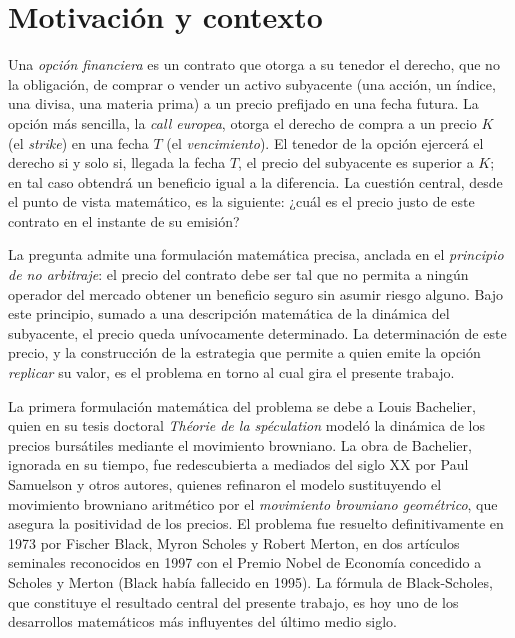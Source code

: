 \documentclass[11pt,a4paper,oneside]{report}
\theoremstyle{plain}
\theoremstyle{definition}
\theoremstyle{remark}
\newcommand{\1}{\mathbf{1}}
\begin{document}
\section{Motivación y contexto}
\label{sec:motivacion}

Una \emph{opción financiera} es un contrato que otorga a su tenedor el
derecho, que no la obligación, de comprar o vender un activo subyacente
(una acción, un índice, una divisa, una materia prima) a un precio
prefijado en una fecha futura. La opción más sencilla, la \emph{call
europea}, otorga el derecho de compra a un precio $K$ (el
\emph{strike}) en una fecha $T$ (el \emph{vencimiento}). El tenedor de
la opción ejercerá el derecho si y solo si, llegada la fecha $T$, el
precio del subyacente es superior a $K$; en tal caso obtendrá un
beneficio igual a la diferencia. La cuestión central, desde el punto
de vista matemático, es la siguiente: ¿cuál es el precio justo de
este contrato en el instante de su emisión?

La pregunta admite una formulación matemática precisa, anclada en el
\emph{principio de no arbitraje}: el precio del contrato debe ser tal
que no permita a ningún operador del mercado obtener un beneficio
seguro sin asumir riesgo alguno. Bajo este principio, sumado a una
descripción matemática de la dinámica del subyacente, el precio queda
unívocamente determinado. La determinación de este precio, y la
construcción de la estrategia que permite a quien emite la opción
\emph{replicar} su valor, es el problema en torno al cual gira el presente
trabajo.

La primera formulación matemática
del problema se debe a Louis Bachelier, quien en su tesis doctoral
\emph{Théorie de la spéculation} \cite{bachelier} modeló la dinámica
de los precios bursátiles mediante el movimiento browniano. La obra
de Bachelier, ignorada en su tiempo, fue redescubierta a mediados del
siglo XX por Paul Samuelson y otros autores, quienes refinaron el
modelo sustituyendo el movimiento browniano aritmético por el
\emph{movimiento browniano geométrico}, que asegura la positividad de
los precios. El problema fue resuelto definitivamente en 1973 por
Fischer Black, Myron Scholes y Robert Merton, en dos artículos
seminales \cite{black-scholes,merton} reconocidos en 1997 con el
Premio Nobel de Economía concedido a Scholes y Merton (Black había
fallecido en 1995). La fórmula de Black-Scholes, que constituye el
resultado central del presente trabajo, es hoy uno de los desarrollos
matemáticos más influyentes del último medio siglo.
\end{document}
